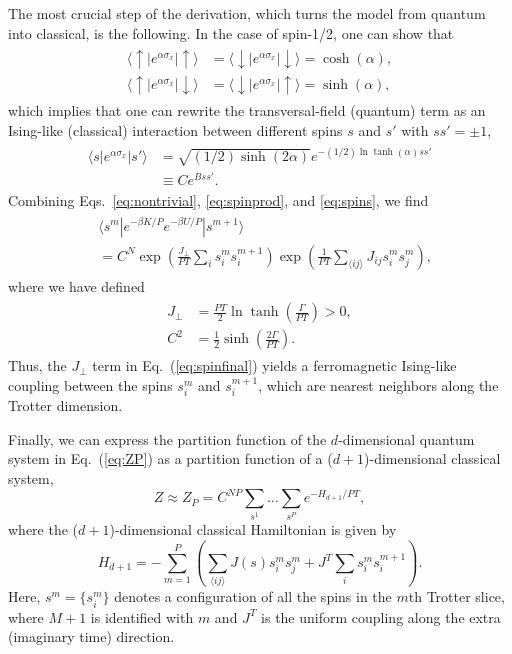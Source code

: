 \documentclass[aps,prd,twocolumn, superscriptaddress,preprintnumbers, nofootinbib,longbibliography,floatfix]{revtex4-2}
\DeclareRobustCommand{\Eq}[1]{Eq.~(\ref{#1})}
\begin{document}
The most crucial step of the derivation, which turns the model from quantum into classical, is the following. In the case of spin-1/2, one can show that
%
\begin{align}
\begin{split}
\langle \uparrow|e^{\alpha\sigma_x}|\uparrow\rangle &= \langle \downarrow|e^{\alpha\sigma_x}|\downarrow\rangle = \cosh(\alpha),\\
\langle \uparrow|e^{\alpha\sigma_x}|\downarrow\rangle &= \langle \downarrow|e^{\alpha\sigma_x}|\uparrow\rangle = \sinh(\alpha),
\end{split}
\end{align}
%
which implies that one can rewrite the transversal-field (quantum) term as an Ising-like (classical) interaction between different spins $s$ and $s'$ with $ss'=\pm 1$,
%
\begin{align}
\begin{split}
\langle s|e^{\alpha\sigma_x}|s'\rangle &= \sqrt{(1/2)\sinh(2\alpha)} e^{-(1/2)\ln \tanh(\alpha) ss'}\\
&\equiv C e^{B ss'}.
\end{split}
\label{eq:spins}
\end{align}
%
Combining Eqs.~\eqref{eq:nontrivial}, \eqref{eq:spinprod}, and \eqref{eq:spins}, we find
%
\begin{align}
\begin{split}
&\langle s^m| e^{-\beta K/P}e^{-\beta U/P} | s^{m+1}\rangle\\
 &= C^N \exp\left(\frac{J_\perp}{PT} \sum_{i}s_i^{m}s_i^{m+1}\right) \exp\left(\frac{1}{PT} \sum_{\langle ij\rangle}J_{ij} s_i^{m}s_j^{m}\right),
\end{split}
\label{eq:spinfinal}
\end{align}
%
where we have defined
%
\begin{align}
\begin{split}
J_\perp &= \frac{PT}{2} \ln \tanh\left(\frac{\Gamma}{PT}\right)>0,\\
C^2 &= \frac{1}{2}\sinh\left( \frac{2\Gamma}{PT}\right).
\end{split}
\label{eq:JC}
\end{align}
%
Thus, the $J_\perp$ term in \Eq{eq:spinfinal} yields a ferromagnetic Ising-like coupling between the spins $s_i^m$ and $s_i^{m+1}$, which are nearest neighbors along the Trotter dimension.

Finally, we can express the partition function of the $d$-dimensional quantum system in \Eq{eq:ZP} as a partition function of a ($d+1$)-dimensional classical system,
%
\begin{equation}
Z\approx Z_P = C^{NP}\sum_{s^1}\ldots\sum_{s^P}e^{-H_{d+1}/PT},
\end{equation}
%
where the ($d+1$)-dimensional classical Hamiltonian is given by 
%
\begin{equation}
H_{d+1}=-\sum_{m=1}^P\left(\sum_{\langle ij\rangle}J(s)s_i^ms_j^m+J^T\sum_is_i^ms_i^{m+1} \right).
\end{equation}
%
Here, $s^m=\{s^m_i\}$ denotes a configuration of all the spins in the $m$th Trotter slice, where $M+1$ is identified with $m$ and $J^T$ is the uniform coupling along the extra (imaginary time) direction.
\end{document}
